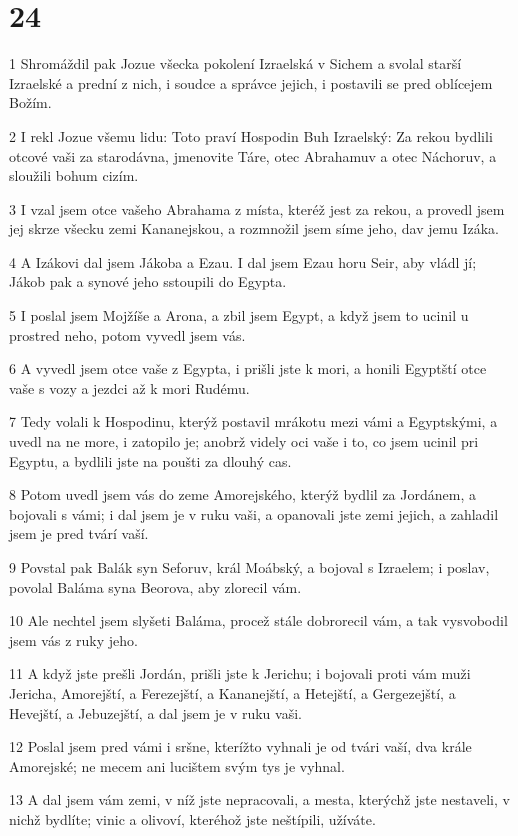 \chapter{24}

\par 1 Shromáždil pak Jozue všecka pokolení Izraelská v Sichem a svolal starší Izraelské a prední z nich, i soudce a správce jejich, i postavili se pred oblícejem Božím.
\par 2 I rekl Jozue všemu lidu: Toto praví Hospodin Buh Izraelský: Za rekou bydlili otcové vaši za starodávna, jmenovite Táre, otec Abrahamuv a otec Náchoruv, a sloužili bohum cizím.
\par 3 I vzal jsem otce vašeho Abrahama z místa, kteréž jest za rekou, a provedl jsem jej skrze všecku zemi Kananejskou, a rozmnožil jsem síme jeho, dav jemu Izáka.
\par 4 A Izákovi dal jsem Jákoba a Ezau. I dal jsem Ezau horu Seir, aby vládl jí; Jákob pak a synové jeho sstoupili do Egypta.
\par 5 I poslal jsem Mojžíše a Arona, a zbil jsem Egypt, a když jsem to ucinil u prostred neho, potom vyvedl jsem vás.
\par 6 A vyvedl jsem otce vaše z Egypta, i prišli jste k mori, a honili Egyptští otce vaše s vozy a jezdci až k mori Rudému.
\par 7 Tedy volali k Hospodinu, kterýž postavil mrákotu mezi vámi a Egyptskými, a uvedl na ne more, i zatopilo je; anobrž videly oci vaše i to, co jsem ucinil pri Egyptu, a bydlili jste na poušti za dlouhý cas.
\par 8 Potom uvedl jsem vás do zeme Amorejského, kterýž bydlil za Jordánem, a bojovali s vámi; i dal jsem je v ruku vaši, a opanovali jste zemi jejich, a zahladil jsem je pred tvárí vaší.
\par 9 Povstal pak Balák syn Seforuv, král Moábský, a bojoval s Izraelem; i poslav, povolal Baláma syna Beorova, aby zlorecil vám.
\par 10 Ale nechtel jsem slyšeti Baláma, procež stále dobrorecil vám, a tak vysvobodil jsem vás z ruky jeho.
\par 11 A když jste prešli Jordán, prišli jste k Jerichu; i bojovali proti vám muži Jericha, Amorejští, a Ferezejští, a Kananejští, a Hetejští, a Gergezejští, a Hevejští, a Jebuzejští, a dal jsem je v ruku vaši.
\par 12 Poslal jsem pred vámi i sršne, kterížto vyhnali je od tvári vaší, dva krále Amorejské; ne mecem ani lucištem svým tys je vyhnal.
\par 13 A dal jsem vám zemi, v níž jste nepracovali, a mesta, kterýchž jste nestaveli, v nichž bydlíte; vinic a olivoví, kteréhož jste neštípili, užíváte.
